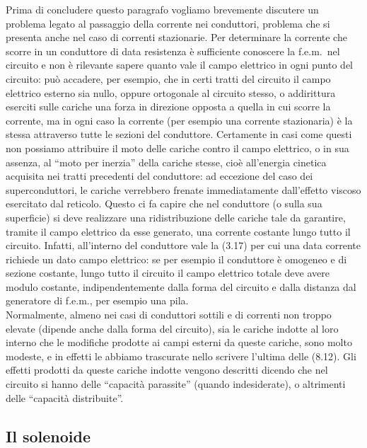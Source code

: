 Prima di concludere questo paragrafo vogliamo brevemente discutere un problema
legato al passaggio della corrente nei conduttori, problema che si presenta
anche nel caso di correnti stazionarie. Per determinare la corrente che scorre
in un conduttore di data resistenza \`e sufficiente conoscere la f.e.m.\ nel
circuito e non \`e rilevante sapere quanto vale il campo elettrico in ogni punto
del circuito: pu\`o accadere, per esempio, che in certi tratti del circuito il
campo elettrico esterno sia nullo, oppure ortogonale al circuito stesso, o
addirittura eserciti sulle cariche una forza in direzione opposta a quella in
cui scorre la corrente, ma in ogni caso la corrente (per esempio una corrente
stazionaria) \`e la stessa attraverso tutte le sezioni del conduttore.
Certamente in casi come questi non possiamo attribuire il moto delle cariche
contro il campo elettrico, o in sua assenza, al ``moto per inerzia'' della
cariche stesse, cio\`e all'energia cinetica acquisita nei tratti precedenti del
conduttore: ad eccezione del caso dei superconduttori, le cariche verrebbero
frenate immediatamente dall'effetto viscoso esercitato dal reticolo. Questo ci
fa capire che nel conduttore (o sulla sua superficie) si deve realizzare una
ridistribuzione delle cariche tale da garantire, tramite il campo elettrico da
esse generato, una corrente costante lungo tutto il circuito. Infatti,
all'interno del conduttore vale la (3.17) per cui una data corrente richiede un
dato campo elettrico: se per esempio il conduttore \`e omogeneo e di sezione
costante, lungo tutto il circuito il campo elettrico totale deve avere modulo
costante, indipendentemente dalla forma del circuito e dalla distanza dal
generatore di f.e.m., per esempio una pila.\\
Normalmente, almeno nei casi di conduttori sottili e di correnti non troppo
elevate (dipende anche dalla forma del circuito), sia le cariche indotte al loro
interno che le modifiche prodotte ai campi esterni da queste cariche, sono molto
modeste, e in effetti le abbiamo trascurate nello scrivere l'ultima delle
(8.12). Gli effetti prodotti da queste cariche indotte vengono descritti dicendo
che nel circuito si hanno delle ``capacit\`a parassite'' (quando indesiderate),
o altrimenti delle ``capacit\`a distribuite''.

\subsection{Il solenoide}

